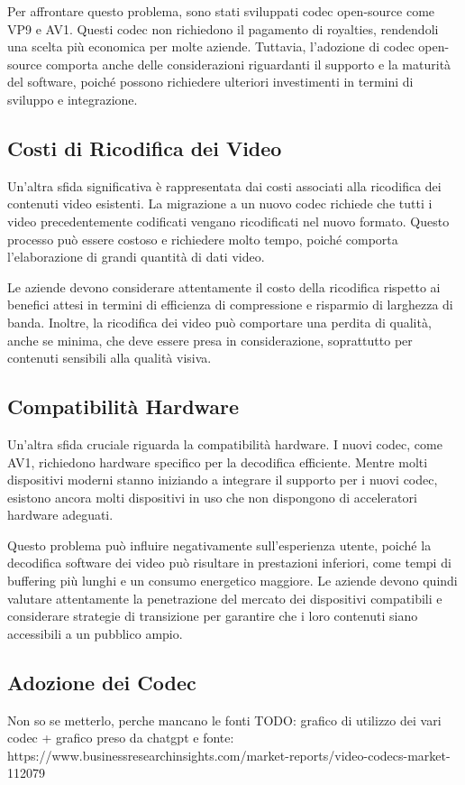 \documentclass[a4paper,12pt, oneside]{article}
\begin{document}
Per affrontare questo problema, sono stati sviluppati codec open-source come VP9 e AV1. Questi
codec non richiedono il pagamento di royalties, rendendoli una scelta più economica per molte
aziende. Tuttavia, l'adozione di codec open-source comporta anche delle considerazioni riguardanti
il supporto e la maturità del software, poiché possono richiedere ulteriori investimenti in termini
di sviluppo e integrazione.

\subsection{Costi di Ricodifica dei Video}
Un'altra sfida significativa è rappresentata dai costi associati alla ricodifica dei contenuti
video esistenti. La migrazione a un nuovo codec richiede che tutti i video precedentemente
codificati vengano ricodificati nel nuovo formato. Questo processo può essere costoso e richiedere
molto tempo, poiché comporta l'elaborazione di grandi quantità di dati video.

Le aziende devono considerare attentamente il costo della ricodifica rispetto ai benefici attesi
in termini di efficienza di compressione e risparmio di larghezza di banda. Inoltre, la ricodifica
dei video può comportare una perdita di qualità, anche se minima, che deve essere presa in considerazione,
soprattutto per contenuti sensibili alla qualità visiva.

\subsection{Compatibilità Hardware}
Un'altra sfida cruciale riguarda la compatibilità hardware. I nuovi codec, come AV1, richiedono
hardware specifico per la decodifica efficiente. Mentre molti dispositivi moderni stanno iniziando a
integrare il supporto per i nuovi codec, esistono ancora molti dispositivi in uso che non dispongono
di acceleratori hardware adeguati.

Questo problema può influire negativamente sull'esperienza utente, poiché la decodifica software dei
video può risultare in prestazioni inferiori, come tempi di buffering più lunghi e un consumo energetico
maggiore. Le aziende devono quindi valutare attentamente la penetrazione del mercato dei dispositivi
compatibili e considerare strategie di transizione per garantire che i loro contenuti siano accessibili
a un pubblico ampio.

\subsection{Adozione dei Codec}
Non so se metterlo, perche mancano le fonti
TODO: grafico di utilizzo dei vari codec + grafico preso da chatgpt e fonte: https://www.businessresearchinsights.com/market-reports/video-codecs-market-112079
\end{document}
